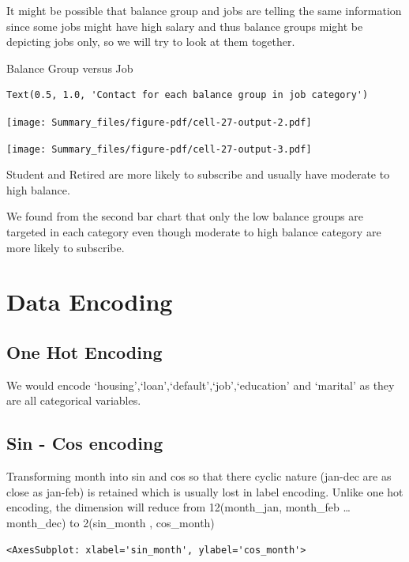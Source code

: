 \documentclass[
  letterpaper,
  DIV=11,
  numbers=noendperiod]{scrartcl}
\begin{document}
It might be possible that balance group and jobs are telling the same
information since some jobs might have high salary and thus balance
groups might be depicting jobs only, so we will try to look at them
together.

Balance Group versus Job

\begin{verbatim}
Text(0.5, 1.0, 'Contact for each balance group in job category')
\end{verbatim}

\texttt{[image: Summary\_files/figure-pdf/cell-27-output-2.pdf]}

\texttt{[image: Summary\_files/figure-pdf/cell-27-output-3.pdf]}

Student and Retired are more likely to subscribe and usually have
moderate to high balance.

We found from the second bar chart that only the low balance groups are
targeted in each category even though moderate to high balance category
are more likely to subscribe.

\hypertarget{data-encoding}{%
\section{Data Encoding}\label{data-encoding}}

\hypertarget{one-hot-encoding}{%
\subsection{One Hot Encoding}\label{one-hot-encoding}}

We would encode `housing',`loan',`default',`job',`education' and
`marital' as they are all categorical variables.

\hypertarget{sin---cos-encoding}{%
\subsection{Sin - Cos encoding}\label{sin---cos-encoding}}

Transforming month into sin and cos so that there cyclic nature (jan-dec
are as close as jan-feb) is retained which is usually lost in label
encoding. Unlike one hot encoding, the dimension will reduce from
12(month\_jan, month\_feb \ldots{} month\_dec) to 2(sin\_month ,
cos\_month)

\begin{verbatim}
<AxesSubplot: xlabel='sin_month', ylabel='cos_month'>
\end{verbatim}
\end{document}
